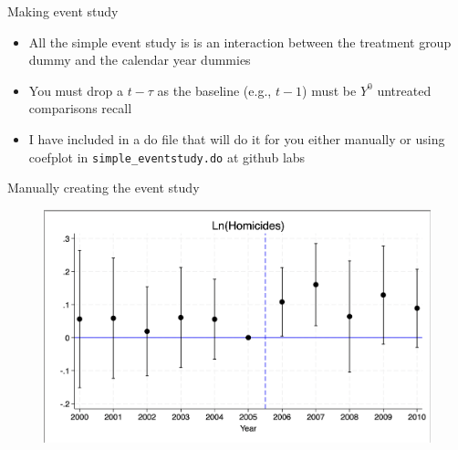 \documentclass{beamer}
\begin{document}
\begin{frame}{Making event study}

\begin{itemize}
\item All the simple event study is is an interaction between the treatment group dummy and the calendar year dummies
\item You must drop a $t-\tau$ as the baseline (e.g., $t-1$) must be $Y^0$ untreated comparisons recall
\item I have included in a do file that will do it for you either manually or using coefplot in \texttt{simple\_eventstudy.do} at github labs
\end{itemize}

\end{frame}


\begin{frame}{Manually creating the event study}

	\begin{figure}
	\includegraphics[scale=0.20]{./lecture_includes/simple_eventstudy_manual}
	\end{figure}

\end{frame}
\end{document}
